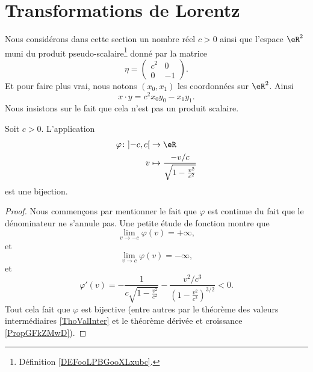 \section{Transformations de Lorentz}

Nous considérons dans cette section un nombre réel \( c>0\) ainsi que l'espace \( \eR^2\) muni du produit pseudo-scalaire\footnote{Définition \ref{DEFooLPBGooXLxubc}.} donné par la matrice
\begin{equation}
	\eta=\begin{pmatrix}
		c^2 & 0  \\
		0   & -1
	\end{pmatrix}.
\end{equation}
Et pour faire plus vrai, nous notons \( (x_0,x_1)\) les coordonnées sur \( \eR^2\). Ainsi
\begin{equation}
	x\cdot y=c^2x_0y_0-x_1y_1.
\end{equation}
Nous insistons sur le fait que cela n'est pas un produit scalaire.

\begin{lemma}        \label{LEMooPZPZooVAdPVj}
	Soit \( c>0\). L'application
	\begin{equation}
		\begin{aligned}
			\varphi\colon \mathopen] -c , c \mathclose[ & \to \eR                                                 \\
			v                                           & \mapsto \frac{ -v/c }{ \sqrt{ 1-\frac{ v^2 }{ c^2 } } }
		\end{aligned}
	\end{equation}
	est une bijection.
\end{lemma}

\begin{proof}
	Nous commençons par mentionner le fait que \( \varphi\) est continue du fait que le dénominateur ne s'annule pas. Une petite étude de fonction montre que
	\begin{equation}
		\lim_{v\to -c} \varphi(v)=+\infty,
	\end{equation}
	et
	\begin{equation}
		\lim_{v\to c} \varphi(v)=-\infty,
	\end{equation}
	et
	\begin{equation}
		\varphi'(v)=-\frac{1}{ c\sqrt{ 1-\frac{ v^2 }{ c^2 } } }-\frac{ v^2/c^3 }{ \left( 1-\frac{ v^2 }{ c^2 } \right)^{3/2} }<0.
	\end{equation}
	Tout cela fait que \( \varphi\) est bijective (entre autres par le théorème des valeurs intermédiaires \ref{ThoValInter} et le théorème dérivée et croissance \ref{PropGFkZMwD}).
\end{proof}

